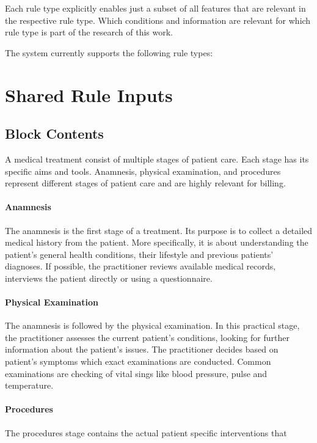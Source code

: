 Each rule type explicitly enables just a subset of all features that are relevant in the respective rule type.
Which conditions and information are relevant for which rule type is part of the research of this work.

The system currently supports the following rule types:


\section{Shared Rule Inputs}

\subsection{Block Contents}
A medical treatment consist of multiple stages of patient care.
Each stage has its specific aims and tools.
Anamnesis, physical examination,
and procedures represent different stages of patient care and are highly relevant for billing.

\paragraph{Anamnesis}
The anamnesis is the first stage of a treatment.
Its purpose is to collect a detailed medical history from the patient\cite{lino2021medical}.
More specifically, it is about understanding the patient's general health conditions,
their lifestyle and previous patients' diagnoses.
If possible, the practitioner reviews available medical records,
interviews the patient directly or using a questionnaire\cite{zhang2011anamnevis}.

\paragraph{Physical Examination}
The anamnesis is followed by the physical examination.
In this practical stage, the practitioner assesses the current patient's conditions,
looking for further information about the patient's issues\cite{seidel2010mosby}.
The practitioner decides based on patient's symptoms which exact examinations are conducted.
Common examinations are checking of vital sings like blood pressure, pulse and temperature.

\paragraph{Procedures}
The procedures stage contains the actual patient specific interventions that

